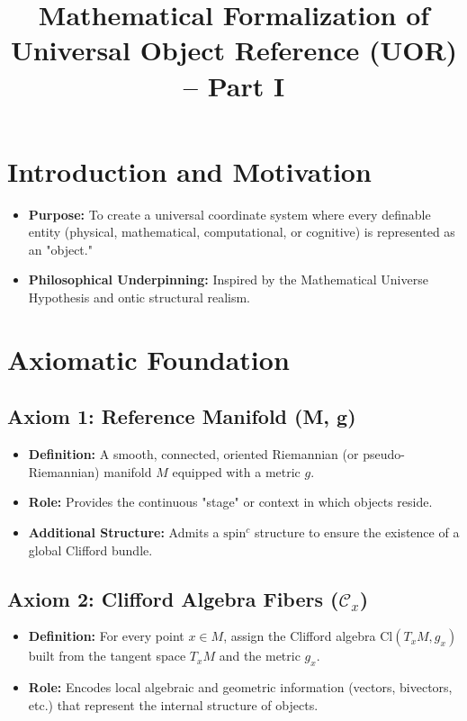 \documentclass[12pt]{article}
\title{Mathematical Formalization of Universal Object Reference (UOR) -- Part I}
\author{}
\date{}
\begin{document}
\maketitle

\section{Introduction and Motivation}
\begin{itemize}
    \item \textbf{Purpose:} To create a universal coordinate system where every definable entity (physical, mathematical, computational, or cognitive) is represented as an "object."
    \item \textbf{Philosophical Underpinning:} Inspired by the Mathematical Universe Hypothesis and ontic structural realism.
\end{itemize}

\section{Axiomatic Foundation}

\subsection{Axiom 1: Reference Manifold (M, g)}
\begin{itemize}
    \item \textbf{Definition:} A smooth, connected, oriented Riemannian (or pseudo-Riemannian) manifold \( M \) equipped with a metric \( g \).
    \item \textbf{Role:} Provides the continuous "stage" or context in which objects reside.
    \item \textbf{Additional Structure:} Admits a \( \text{spin}^c \) structure to ensure the existence of a global Clifford bundle.
\end{itemize}

\subsection{Axiom 2: Clifford Algebra Fibers (\texorpdfstring{\(\mathcal{C}_x\)}{Clifford Algebra Fibers})}
\begin{itemize}
    \item \textbf{Definition:} For every point \( x \in M \), assign the Clifford algebra \( \mathrm{Cl}(T_x M, g_x) \) built from the tangent space \( T_x M \) and the metric \( g_x \).
    \item \textbf{Role:} Encodes local algebraic and geometric information (vectors, bivectors, etc.) that represent the internal structure of objects.
\end{itemize}
\end{document}
